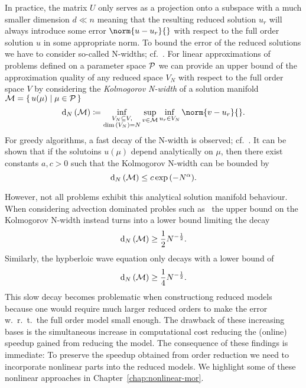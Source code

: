 In practice, the matrix $U$ only serves as a projection onto a subspace with a much smaller dimension $d \ll n$ meaning that the resulting reduced solution $u_r$ will always introduce some error $\norm{u - u_r}{}$ with respect to the full order solution $u$ in some appropriate norm.
To bound the error of the reduced solutions we have to consider so-called N-widths; cf.~\cite{Pinkus1985}.
For linear approximations of problems defined on a parameter space $\mathcal{P}$ we can provide an upper bound of the approximation quality of any reduced space $V_N$ with respect to the full order space $V$ by considering the \emph{Kolmogorov N-width} of a solution manifold $\mathcal{M} = \left\{\,u(\mu)\mid\mu \in \mathcal{P}\,\right\}$
\begin{equation}
    \kolm{\mcl{M}} \coloneqq \inf\limits_{\substack{V_N \subseteq V,\\\dim{(V_N)} = N}} \sup\limits_{v \in \mcl{M}} \inf\limits_{u_r \in V_N} \norm{v - u_r}{}.
\end{equation}
For greedy algorithms, a fast decay of the N-width is observed; cf.~\cite{Binev2011, DeVore2013}.
It can be shown that if the solutoins $u(\mu)$ depend analytically on $\mu$, then there exist constants $a, c > 0$ such that the Kolmogorov N-width can be bounded by
\begin{equation*}
    \mathop{}\!\mathrm{d}_N\left(\mathcal{M}\right) \leq c \exp{(-N^\alpha)}.
\end{equation*}

However, not all problems exhibit this analytical solution manifold behaviour.
When considering advection dominated probles such as~\cite[Section~5.1]{Ohlberger2016} the upper bound on the Kolmogorov N-width instead turns into a lower bound limiting the decay
\begin{equation*}
    \mathop{}\!\mathrm{d}_N\left(\mathcal{M}\right) \geq \frac{1}{2} N^{- \frac{1}{2}}.
\end{equation*}
Similarly, the hypberloic wave equation only decays with a lower bound of
\begin{equation*}
    \mathop{}\!\mathrm{d}_N\left(\mathcal{M}\right) \geq \frac{1}{4} N^{- \frac{1}{2}}.
\end{equation*}
This slow decay becomes problematic when constructiong reduced models because one would require much larger reduced orders to make the error w.\ r.\ t.\ the full order model small enough.
The drawback of these increasing bases is the simultaneous increase in computational cost reducing the (online) speedup gained from reducing the model.
The consequence of these findings is immediate: To preserve the speedup obtained from order reduction we need to incorporate nonlinear parts into the reduced models.
We highlight some of these nonlinear approaches in Chapter~\ref{chap:nonlinear-mor}.
